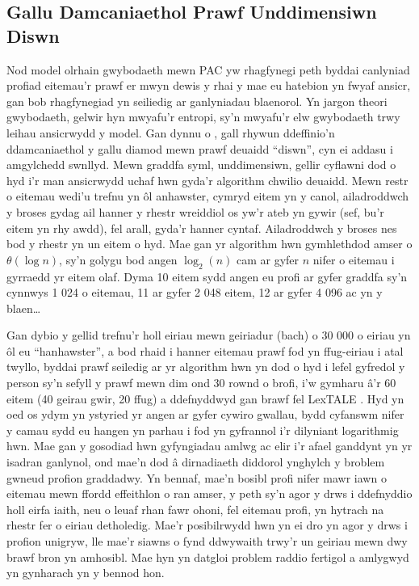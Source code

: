 \subsection{Gallu Damcaniaethol Prawf Unddimensiwn Diswn}
Nod model olrhain gwybodaeth mewn PAC yw rhagfynegi peth byddai canlyniad profiad eitemau'r prawf er mwyn dewis y rhai y mae eu hatebion yn fwyaf ansicr, gan bob rhagfynegiad yn seiliedig ar ganlyniadau blaenorol. Yn jargon theori gwybodaeth, gelwir hyn mwyafu'r entropi, sy'n mwyafu'r elw gwybodaeth trwy leihau ansicrwydd y model. Gan dynnu o \textcite{shannon_mathematical_1948}, gall rhywun ddeffinio'n ddamcaniaethol y gallu diamod mewn prawf deuaidd ``diswn'', cyn ei addasu i amgylchedd swnllyd. Mewn graddfa syml, unddimensiwn, gellir cyflawni dod o hyd i'r man ansicrwydd uchaf hwn gyda'r algorithm chwilio deuaidd. Mewn restr o eitemau wedi'u trefnu yn ôl anhawster, cymryd eitem yn y canol, ailadroddwch y broses gydag ail hanner y rhestr wreiddiol os yw'r ateb yn gywir (sef, bu'r eitem yn rhy awdd), fel arall, gyda'r hanner cyntaf. Ailadroddwch y broses nes bod y rhestr yn un eitem o hyd. Mae gan yr algorithm hwn gymhlethdod amser o $\theta(\log{n})$, sy'n golygu bod angen $\log_2(n)$ cam ar gyfer $n$ nifer o eitemau i gyrraedd yr eitem olaf. Dyma 10 eitem sydd angen eu profi ar gyfer graddfa sy'n cynnwys 1 024 o eitemau, 11 ar gyfer 2 048 eitem, 12 ar gyfer 4 096 ac yn y blaen\ldots

Gan dybio y gellid trefnu'r holl eiriau mewn geiriadur (bach) o 30 000 o eiriau yn ôl eu ``hanhawster'', a bod rhaid i hanner eitemau prawf fod yn ffug-eiriau i atal twyllo, byddai prawf seiledig ar yr algorithm hwn yn dod o hyd i lefel gyfredol y person sy'n sefyll y prawf mewn dim ond 30 rownd o brofi, i'w gymharu â'r 60 eitem (40 geirau gwir, 20 ffug) a ddefnyddwyd gan brawf fel LexTALE \parencite{lemhofer_introducing_2012}. Hyd yn oed os ydym yn ystyried yr angen ar gyfer cywiro gwallau, bydd cyfanswm nifer y camau sydd eu hangen yn parhau i fod yn gyfrannol i'r dilyniant logarithmig hwn. Mae gan y gosodiad hwn gyfyngiadau amlwg ac elir i'r afael ganddynt yn yr isadran ganlynol, ond mae'n dod â dirnadiaeth diddorol ynghylch y broblem gwneud profion graddadwy. Yn bennaf, mae'n bosibl profi nifer mawr iawn o eitemau mewn ffordd effeithlon o ran amser, y peth sy'n agor y drws i ddefnyddio holl eirfa iaith, neu o leuaf rhan fawr ohoni, fel eitemau profi, yn hytrach na rhestr fer o eiriau detholedig. Mae'r posibilrwydd hwn yn ei dro yn agor y drws i profion unigryw, lle mae'r siawns o fynd ddwywaith trwy'r un geiriau mewn dwy brawf bron yn amhosibl. Mae hyn yn datgloi problem raddio fertigol a amlygwyd yn gynharach yn y bennod hon.


